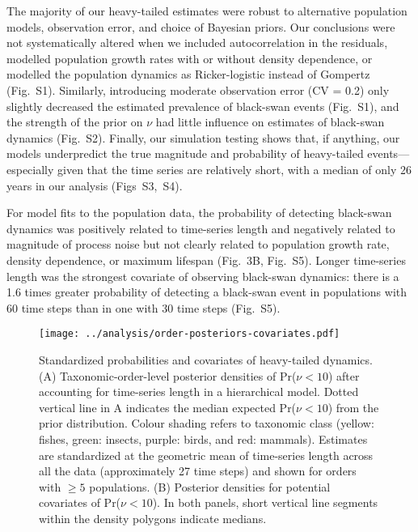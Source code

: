 \documentclass[9pt,twocolumn,twoside]{pnas-new}
\newcommand{\figalt}{{1}}
\newcommand{\figaltpriors}{{2}}
\newcommand{\figsimnu}{{3}}
\newcommand{\figsimprob}{{4}}
\newcommand{\figcorrelates}{{5}}
\begin{document}
The majority of our heavy-tailed estimates were robust to alternative
population models, observation error, and choice of Bayesian priors. Our
conclusions were not systematically altered when we included autocorrelation
in the residuals, modelled population growth rates with or without
density dependence, or modelled the population dynamics as Ricker-logistic
instead of Gompertz (Fig.~S\figalt). Similarly, introducing moderate
observation error (CV = 0.2) only slightly decreased the estimated prevalence
of black-swan events (Fig.~S\figalt), and the strength of the prior on
\(\nu\) had little influence on estimates of black-swan dynamics
(Fig.~S\figaltpriors). Finally, our simulation testing shows that, if
anything, our models underpredict the true magnitude and probability of
heavy-tailed events---especially given that the time series are relatively short,
with a median of only 26
years in our analysis (Figs~S\figsimnu,~S\figsimprob).


For model fits to the population data, the probability of detecting black-swan
dynamics was positively related to time-series length and negatively related to
magnitude of process noise but not clearly related to population growth rate,
density dependence, or maximum lifespan (Fig.~3B, Fig.~S\figcorrelates).
Longer time-series length was the strongest covariate of observing black-swan
dynamics: there is a 1.6 times greater probability of detecting a black-swan
event in populations with 60 time steps than in one with 30 time steps
(Fig.~S\figcorrelates).

\begin{figure}[htb]
\centering
\texttt{[image: ../analysis/order-posteriors-covariates.pdf]}
\caption{Standardized probabilities and covariates of heavy-tailed
dynamics. (A) Taxonomic-order-level posterior densities of Pr(\(\nu
< 10\)) after accounting for time-series length in a hierarchical model. Dotted
vertical line in A indicates the median expected Pr(\(\nu < 10\)) from the
prior distribution. Colour shading refers to taxonomic class (yellow: fishes,
green: insects, purple: birds, and red: mammals). Estimates are standardized at
the geometric mean of time-series length across all the data (approximately 27
time steps) and shown for orders with \(\ge 5\) populations. (B)
Posterior densities for potential covariates of Pr(\(\nu < 10\)). In both
panels, short vertical line segments within the density polygons indicate
medians.
}
\label{fig:3}
\end{figure}
\end{document}
